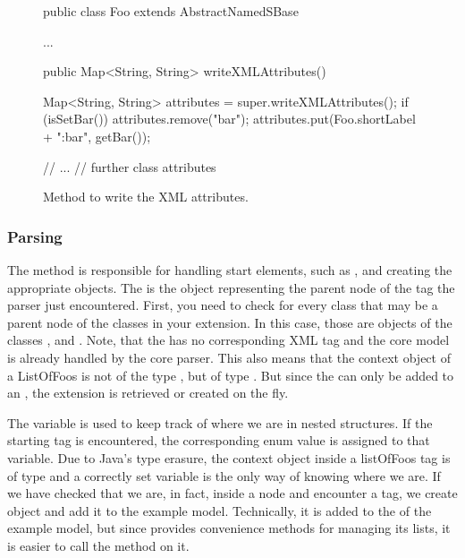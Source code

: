 \begin{figure}[htb]
  \begin{example}[numbers=left]
public class Foo extends AbstractNamedSBase {
  ...

  public Map<String, String> writeXMLAttributes() {
    Map<String, String> attributes = super.writeXMLAttributes();
    if (isSetBar()) {
      attributes.remove("bar");
      attributes.put(Foo.shortLabel + ":bar", getBar());
    }

    // ...
    // further class attributes
  }
}\end{example}
  \caption{Method to write the XML attributes.}
  \label{lst:ModelExtCreateXMLAttributes}
\end{figure}


\subsubsection{Parsing}

The  method is responsible for handling start
elements, such as , and creating the appropriate
objects.  The  is the object representing the parent
node of the tag the parser just encountered.  First, you need to check for
every class that may be a parent node of the classes in your extension.  In
this case, those are objects of the classes \Model,  and
.  Note, that the  has no corresponding XML
tag and the core model is already handled by the core parser.  This also
means that the context object of a ListOfFoos is not of the type
, but of type \Model.  But since the 
can only be added to an , the extension is retrieved or
created on the fly.

The  variable is used to keep track of where we are in
nested structures.  If the  starting tag is encountered,
the corresponding enum value is assigned to that variable.  Due to Java's
type erasure, the context object inside a listOfFoos tag is of type
 and a correctly set  variable is the only
way of knowing where we are.  If we have checked that we are, in fact,
inside a  node and encounter a  tag, we create
 object and add it to the example model.  Technically, it is
added to the  of the example model, but since
 provides convenience methods for managing its lists, it
is easier to call the  method on it.

